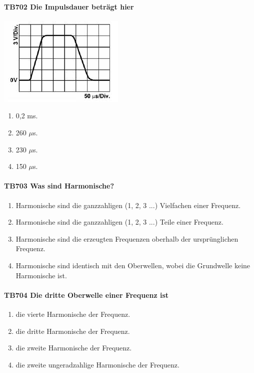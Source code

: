 \documentclass[8pt]{article}
\begin{document}
\begin{enumerate}
\paragraph*{TB702 Die Impulsdauer beträgt hier}
\begin{center}
	\begin{minipage}{\linewidth}
		\centering
		\includegraphics[scale=1.0]{pics/tb702_a.jpg}
	\end{minipage}
\end{center}
\begin{enumerate}[nolistsep,label=\Alph*]
\item 0,2 ms.
\item 260 $\mu$s.
\item 230 $\mu$s.
\item 150 $\mu$s.
\end{enumerate}

\paragraph*{TB703 Was sind Harmonische?}
\begin{enumerate}[nolistsep,label=\Alph*]
\item Harmonische sind die ganzzahligen (1, 2, 3 ...) Vielfachen einer Frequenz.
\item Harmonische sind die ganzzahligen (1, 2, 3 ...) Teile einer Frequenz.
\item Harmonische sind die erzeugten Frequenzen oberhalb der ursprünglichen Frequenz.
\item Harmonische sind identisch mit den Oberwellen, wobei die Grundwelle keine Harmonische ist.
\end{enumerate}

\paragraph*{TB704 Die dritte Oberwelle einer Frequenz ist}
\begin{enumerate}[nolistsep,label=\Alph*]
\item die vierte Harmonische der Frequenz.
\item die dritte Harmonische der Frequenz.
\item die zweite Harmonische der Frequenz.
\item die zweite ungeradzahlige Harmonische der Frequenz.
\end{enumerate}


\end{enumerate}
\end{document}
